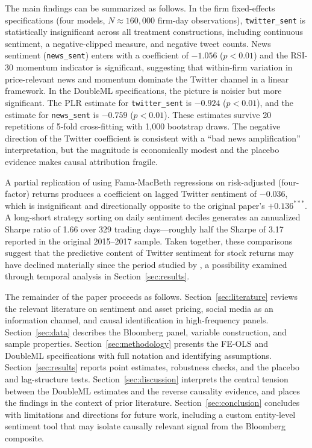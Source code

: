 The main findings can be summarized as follows. In the firm fixed-effects specifications (four
models, $N \approx 160{,}000$ firm-day observations), \texttt{twitter\_sent} is statistically
insignificant across all treatment constructions, including continuous sentiment, a
negative-clipped measure, and negative tweet counts. News sentiment (\texttt{news\_sent}) enters
with a coefficient of $-1.056$ ($p < 0.01$) and the RSI-30 momentum indicator is significant,
suggesting that within-firm variation in price-relevant news and momentum dominate the Twitter
channel in a linear framework. In the DoubleML specifications, the picture is noisier but more
significant. The PLR estimate for \texttt{twitter\_sent} is $-0.924$ ($p < 0.01$), and the
estimate for \texttt{news\_sent} is $-0.759$ ($p < 0.01$). These estimates survive 20 repetitions
of 5-fold cross-fitting with 1{,}000 bootstrap draws. The negative direction of the Twitter
coefficient is consistent with a ``bad news amplification'' interpretation, but the magnitude is
economically modest and the placebo evidence makes causal attribution fragile.

A partial replication of \citet{gu2020} using Fama-MacBeth regressions on risk-adjusted
(four-factor) returns produces a coefficient on lagged Twitter sentiment of $-0.036$, which is
insignificant and directionally opposite to the original paper's $+0.136^{***}$. A long-short
strategy sorting on daily sentiment deciles generates an annualized Sharpe ratio of 1.66 over 329
trading days---roughly half the Sharpe of 3.17 reported in the original 2015--2017 sample. Taken
together, these comparisons suggest that the predictive content of Twitter sentiment for stock
returns may have declined materially since the period studied by \citet{gu2020}, a possibility
examined through temporal analysis in Section~\ref{sec:results}.

The remainder of the paper proceeds as follows. Section~\ref{sec:literature} reviews the relevant
literature on sentiment and asset pricing, social media as an information channel, and causal
identification in high-frequency panels. Section~\ref{sec:data} describes the Bloomberg panel,
variable construction, and sample properties. Section~\ref{sec:methodology} presents the FE-OLS
and DoubleML specifications with full notation and identifying assumptions.
Section~\ref{sec:results} reports point estimates, robustness checks, and the placebo and
lag-structure tests. Section~\ref{sec:discussion} interprets the central tension between the
DoubleML estimates and the reverse causality evidence, and places the findings in the context of
prior literature. Section~\ref{sec:conclusion} concludes with limitations and directions for
future work, including a custom entity-level sentiment tool that may isolate causally relevant
signal from the Bloomberg composite.


